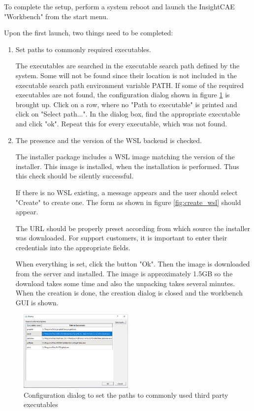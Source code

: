 To complete the setup, perform a system reboot and launch the InsightCAE "Workbench" from the start menu.

Upon the first launch, two things need to be completed:
\begin{enumerate}
\item Set paths to commonly required executables.

The executables are searched in the executable search path defined by the system. 
Some will not be found since their location is not included in the executable search path environment variable PATH.
If some of the required executables are not found, the configuration dialog shown in figure \ref{fig:set_paths} is brought up.
Click on a row, where no "Path to executable" is printed and click on "Select path...". 
In the dialog box, find the appropriate executable and click "ok".
Repeat this for every executable, which was not found.

\item The presence and the version of the WSL backend is checked.

The installer package includes a WSL image matching the version of the installer.
This image is installed, when the installation is performed.
Thus this check should be silently successful.

If there is no WSL existing, a message appears and the user should select "Create" to create one.
The form as shown in figure \ref{fig:create_wsl} should appear.

The URL should be properly preset according from which source the installer was downloaded.
For support customers, it is important to enter their credentials into the appropriate fields.

When everything is set, click the button "Ok".
Then the image is downloaded from the server and installed.
The image is approximately 1.5GB so the download takes some time and also the unpacking takes several minutes.
When the creation is done, the creation dialog is closed and the workbench GUI is shown.

\end{enumerate}

\begin{figure}[ht]
\centering
\includegraphics[width=0.5\textwidth]{figs/workbench/set_paths}
\caption{Configuration dialog to set the paths to commonly used third party executables}
\label{fig:set_paths}
\end{figure}

